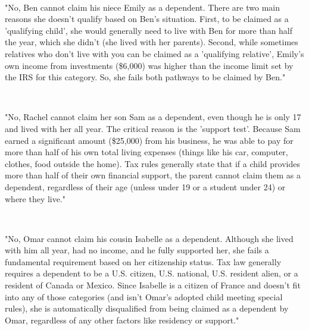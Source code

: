 \documentclass[11pt, letterpaper]{article}
\begin{document}
\begin{description}[style=unboxed, leftmargin=0pt]
    \item[For Scenario ND1 (Emily - Non-Dependent)] \mbox{} \\ \begin{RaggedRight}
    "No, Ben cannot claim his niece Emily as a dependent. There are two main reasons she doesn't qualify based on Ben's situation. First, to be claimed as a 'qualifying child', she would generally need to live with Ben for more than half the year, which she didn't (she lived with her parents). Second, while sometimes relatives who don't live with you can be claimed as a 'qualifying relative', Emily's own income from investments (\$6,000) was higher than the income limit set by the IRS for this category. So, she fails both pathways to be claimed by Ben."
    \end{RaggedRight}

    \item[For Scenario ND2 (Sam - Non-Dependent)] \mbox{} \\ \begin{RaggedRight}
    "No, Rachel cannot claim her son Sam as a dependent, even though he is only 17 and lived with her all year. The critical reason is the 'support test'. Because Sam earned a significant amount (\$25,000) from his business, he was able to pay for more than half of his own total living expenses (things like his car, computer, clothes, food outside the home). Tax rules generally state that if a child provides more than half of their own financial support, the parent cannot claim them as a dependent, regardless of their age (unless under 19 or a student under 24) or where they live."
    \end{RaggedRight}

    \item[For Scenario ND3 (Isabelle - Non-Dependent)] \mbox{} \\ \begin{RaggedRight}
    "No, Omar cannot claim his cousin Isabelle as a dependent. Although she lived with him all year, had no income, and he fully supported her, she fails a fundamental requirement based on her citizenship status. Tax law generally requires a dependent to be a U.S. citizen, U.S. national, U.S. resident alien, or a resident of Canada or Mexico. Since Isabelle is a citizen of France and doesn't fit into any of those categories (and isn't Omar's adopted child meeting special rules), she is automatically disqualified from being claimed as a dependent by Omar, regardless of any other factors like residency or support."
    \end{RaggedRight}
\end{description}

\end{document}
